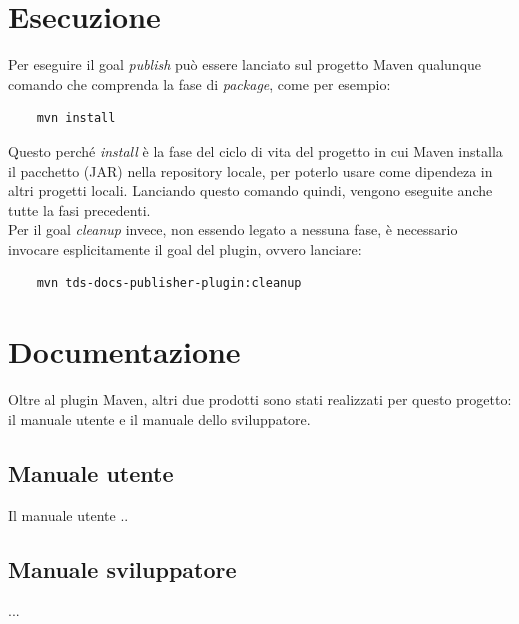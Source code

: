 \clearpage

\section{Esecuzione}
Per eseguire il goal \emph{publish} può essere lanciato sul progetto Maven qualunque comando che comprenda la fase di \emph{package}, come per esempio:
\begin{lstlisting} 
    mvn install
\end{lstlisting}
Questo perché \emph{install} è la fase del ciclo di vita del progetto in cui Maven installa il pacchetto (JAR) nella repository locale, per poterlo usare come dipendeza in altri progetti locali.
Lanciando questo comando quindi, vengono eseguite anche tutte la fasi precedenti.\\

Per il goal \emph{cleanup} invece, non essendo legato a nessuna fase, è necessario invocare esplicitamente il goal del plugin, ovvero lanciare:
\begin{lstlisting} 
    mvn tds-docs-publisher-plugin:cleanup
\end{lstlisting}


\section{Documentazione}    \label{secDocumentazione}
Oltre al plugin Maven, altri due prodotti sono stati realizzati per questo progetto: il manuale utente e il manuale dello sviluppatore.

    \subsection{Manuale utente}
    Il manuale utente ..

    \subsection{Manuale sviluppatore}
    ...






